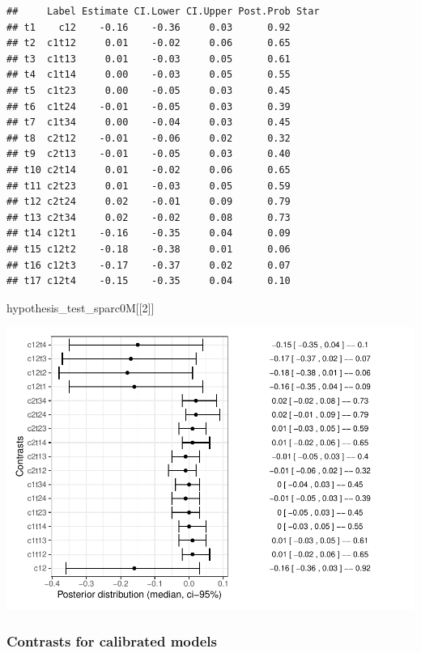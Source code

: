 \documentclass[
]{article}
\newenvironment{Shaded}{\begin{snugshade}}{\end{snugshade}}
\newcommand{\DecValTok}[1]{\textcolor[rgb]{0.00,0.00,0.81}{#1}}
\newcommand{\NormalTok}[1]{#1}
\begin{document}
\begin{verbatim}
##     Label Estimate CI.Lower CI.Upper Post.Prob Star
## t1    c12    -0.16    -0.36     0.03      0.92     
## t2  c1t12     0.01    -0.02     0.06      0.65     
## t3  c1t13     0.01    -0.03     0.05      0.61     
## t4  c1t14     0.00    -0.03     0.05      0.55     
## t5  c1t23     0.00    -0.05     0.03      0.45     
## t6  c1t24    -0.01    -0.05     0.03      0.39     
## t7  c1t34     0.00    -0.04     0.03      0.45     
## t8  c2t12    -0.01    -0.06     0.02      0.32     
## t9  c2t13    -0.01    -0.05     0.03      0.40     
## t10 c2t14     0.01    -0.02     0.06      0.65     
## t11 c2t23     0.01    -0.03     0.05      0.59     
## t12 c2t24     0.02    -0.01     0.09      0.79     
## t13 c2t34     0.02    -0.02     0.08      0.73     
## t14 c12t1    -0.16    -0.35     0.04      0.09     
## t15 c12t2    -0.18    -0.38     0.01      0.06     
## t16 c12t3    -0.17    -0.37     0.02      0.07     
## t17 c12t4    -0.15    -0.35     0.04      0.10
\end{verbatim}

\begin{Shaded}
\begin{Highlighting}[]
\NormalTok{hypothesis\_test\_sparc0M[[}\DecValTok{2}\NormalTok{]]}
\end{Highlighting}
\end{Shaded}

\includegraphics{06_Publish_GUSO_ASIL_files/figure-latex/Contrasts0M-2.pdf}

\hypertarget{contrasts-for-calibrated-models}{%
\subsubsection{Contrasts for calibrated
models}\label{contrasts-for-calibrated-models}}
\end{document}
